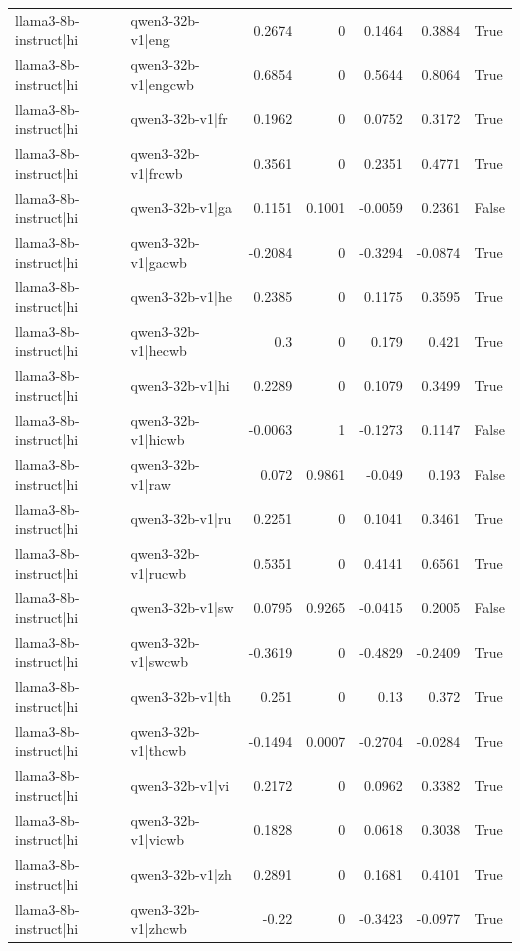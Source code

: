 \begin{table}
\begin{tabular}{l l r r r r l}
llama3-8b-instruct|hi & qwen3-32b-v1|eng & 0.2674 & 0 & 0.1464 & 0.3884 & True \\
llama3-8b-instruct|hi & qwen3-32b-v1|engcwb & 0.6854 & 0 & 0.5644 & 0.8064 & True \\
llama3-8b-instruct|hi & qwen3-32b-v1|fr & 0.1962 & 0 & 0.0752 & 0.3172 & True \\
llama3-8b-instruct|hi & qwen3-32b-v1|frcwb & 0.3561 & 0 & 0.2351 & 0.4771 & True \\
llama3-8b-instruct|hi & qwen3-32b-v1|ga & 0.1151 & 0.1001 & -0.0059 & 0.2361 & False \\
llama3-8b-instruct|hi & qwen3-32b-v1|gacwb & -0.2084 & 0 & -0.3294 & -0.0874 & True \\
llama3-8b-instruct|hi & qwen3-32b-v1|he & 0.2385 & 0 & 0.1175 & 0.3595 & True \\
llama3-8b-instruct|hi & qwen3-32b-v1|hecwb & 0.3 & 0 & 0.179 & 0.421 & True \\
llama3-8b-instruct|hi & qwen3-32b-v1|hi & 0.2289 & 0 & 0.1079 & 0.3499 & True \\
llama3-8b-instruct|hi & qwen3-32b-v1|hicwb & -0.0063 & 1 & -0.1273 & 0.1147 & False \\
llama3-8b-instruct|hi & qwen3-32b-v1|raw & 0.072 & 0.9861 & -0.049 & 0.193 & False \\
llama3-8b-instruct|hi & qwen3-32b-v1|ru & 0.2251 & 0 & 0.1041 & 0.3461 & True \\
llama3-8b-instruct|hi & qwen3-32b-v1|rucwb & 0.5351 & 0 & 0.4141 & 0.6561 & True \\
llama3-8b-instruct|hi & qwen3-32b-v1|sw & 0.0795 & 0.9265 & -0.0415 & 0.2005 & False \\
llama3-8b-instruct|hi & qwen3-32b-v1|swcwb & -0.3619 & 0 & -0.4829 & -0.2409 & True \\
llama3-8b-instruct|hi & qwen3-32b-v1|th & 0.251 & 0 & 0.13 & 0.372 & True \\
llama3-8b-instruct|hi & qwen3-32b-v1|thcwb & -0.1494 & 0.0007 & -0.2704 & -0.0284 & True \\
llama3-8b-instruct|hi & qwen3-32b-v1|vi & 0.2172 & 0 & 0.0962 & 0.3382 & True \\
llama3-8b-instruct|hi & qwen3-32b-v1|vicwb & 0.1828 & 0 & 0.0618 & 0.3038 & True \\
llama3-8b-instruct|hi & qwen3-32b-v1|zh & 0.2891 & 0 & 0.1681 & 0.4101 & True \\
llama3-8b-instruct|hi & qwen3-32b-v1|zhcwb & -0.22 & 0 & -0.3423 & -0.0977 & True \\

\end{tabular}
\end{table}

